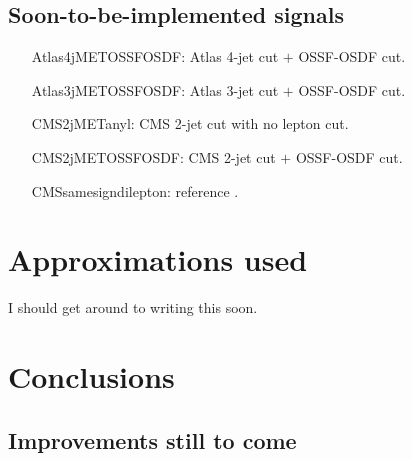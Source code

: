 \documentclass[10pt]{article}
\begin{document}
\subsection{Soon-to-be-implemented signals}
\label{subsec:soonSignals}

\begin{itemize}

\item[Atlas4jMETOSSFOSDF:] Atlas 4-jet cut $+$ OSSF-OSDF cut.

\item[Atlas3jMETOSSFOSDF:] Atlas 3-jet cut $+$ OSSF-OSDF cut.

\item[CMS2jMETanyl:] CMS 2-jet cut with no lepton cut.

\item[CMS2jMETOSSFOSDF:] CMS 2-jet cut $+$ OSSF-OSDF cut.

\item[CMSsamesigndilepton:] reference \cite{Chatrchyan:2011wba}.

\end{itemize}


\section{Approximations used}
\label{sec:approximations}

I should get around to writing this soon.


\section{Conclusions}
\label{sec:conclusions}


\begin{appendix}

\section{Improvements still to come}
\label{app:improvements}


\end{appendix}


\end{document}
